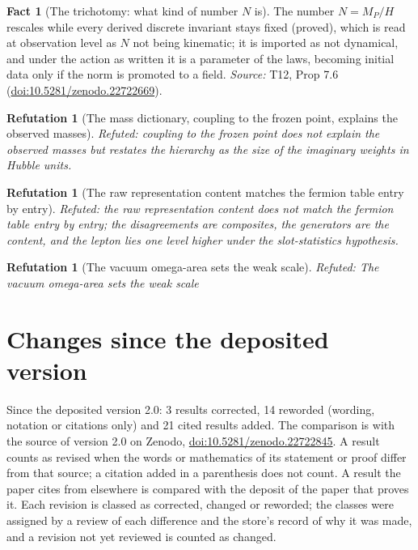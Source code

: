 \documentclass[11pt]{article}
\newtheorem{refutation}[theorem]{Refutation}
\theoremstyle{definition}
\newtheorem{fact}[theorem]{Fact}
\theoremstyle{plain}
\newcommand{\changedmark}[2]{\marginpar{\raggedright\scriptsize\color{#1}#2}}
\begin{document}
\begin{fact}[The trichotomy: what kind of number $N$ is]\label{c:standard-model.trichotomy-what-kind-number}
\changedmark{BrickRed}{corrected since the deposit}
The number $N = M_{P}/H$ rescales while every derived discrete invariant stays fixed (proved), which is read at observation level as $N$ not being kinematic; it is imported as not dynamical, and under the action as written it is a parameter of the laws, becoming initial data only if the norm is promoted to a field.
\emph{Source:} T12, Prop 7.6 (\href{https://doi.org/10.5281/zenodo.22722669}{doi:10.5281/zenodo.22722669}).
\end{fact}

\begin{refutation}[The mass dictionary, coupling to the frozen point, explains the observed masses]\label{c:refuted.the-mass-dictionary-coupling-to-the-frozen-point}
Refuted: coupling to the frozen point does not explain the observed masses but restates the hierarchy as the size of the imaginary weights in Hubble units.
\end{refutation}

\begin{refutation}[The raw representation content matches the fermion table entry by entry]\label{c:refuted.the-raw-representation-content-matches-the-fermi}
Refuted: the raw representation content does not match the fermion table entry by entry; the disagreements are composites, the generators are the content, and the lepton lies one level higher under the slot-statistics hypothesis.
\end{refutation}

\begin{refutation}[The vacuum omega-area sets the weak scale]\label{c:refuted.the-vacuum-omega-area-sets-the-weak-scale}
Refuted: The vacuum omega-area sets the weak scale
\end{refutation}

\section*{Changes since the deposited version}
Since the deposited version 2.0: 3 results corrected, 14 reworded (wording, notation or citations only) and 21 cited results added. The comparison is with the source of version 2.0 on Zenodo, \href{https://doi.org/10.5281/zenodo.22722845}{doi:10.5281/zenodo.22722845}. A result counts as revised when the words or mathematics of its statement or proof differ from that source; a citation added in a parenthesis does not count. A result the paper cites from elsewhere is compared with the deposit of the paper that proves it. Each revision is classed as corrected, changed or reworded; the classes were assigned by a review of each difference and the store's record of why it was made, and a revision not yet reviewed is counted as changed.
\end{document}
